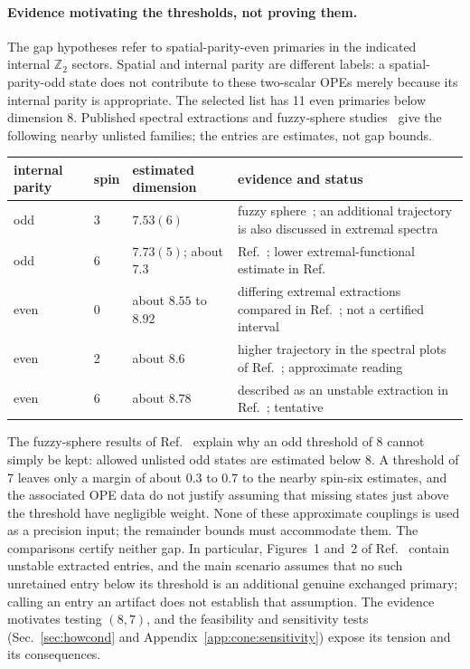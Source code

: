 \documentclass[11pt,a4paper]{article}
\numberwithin{equation}{section}
\begin{document}
\paragraph{Evidence motivating the thresholds, not proving them.} The gap hypotheses refer to spatial-parity-even
primaries in the indicated internal $\mathbb Z_2$ sectors. Spatial and internal parity are different labels: a
spatial-parity-odd state does not contribute to these two-scalar OPEs merely because its internal parity is
appropriate. The selected list has 11 even primaries below dimension 8. Published spectral extractions and fuzzy-sphere
studies~\cite{Simmons-Duffin:2016wlq,Henriksson:2022,Zhu:2022,Fardelli:2026} give the following nearby unlisted
families; the entries are estimates, not gap bounds.
\begin{center}\small
\begin{tabular}{@{}llp{}p{}@{}}
\toprule
internal parity & spin & estimated dimension & evidence and status\\
\midrule
odd & 3 & $7.53(6)$ & fuzzy sphere~\cite{Fardelli:2026}; an additional trajectory is also discussed in extremal spectra\\
odd & 6 & $7.73(5)$; about $7.3$ & Ref.~\cite{Fardelli:2026}; lower extremal-functional estimate in Ref.~\cite{Henriksson:2022}\\
even & 0 & about $8.55$ to $8.92$ & differing extremal extractions compared in Ref.~\cite{Henriksson:2022}; not a certified interval\\
even & 2 & about $8.6$ & higher trajectory in the spectral plots of Ref.~\cite{Henriksson:2022}; approximate reading\\
even & 6 & about $8.78$ & described as an unstable extraction in Ref.~\cite{Henriksson:2022}; tentative\\
\bottomrule
\end{tabular}
\end{center}
The fuzzy-sphere results of Ref.~\cite{Fardelli:2026} explain why an odd threshold of 8 cannot simply be kept: allowed
unlisted odd states are estimated below 8. A threshold of 7 leaves only a margin of about $0.3$ to $0.7$ to the nearby
spin-six estimates, and the associated OPE data do not justify assuming that missing states just above the threshold
have negligible weight. None of these approximate couplings is used as a precision input; the remainder bounds must
accommodate them. The comparisons certify neither gap. In particular, Figures~1 and~2 of
Ref.~\cite{Simmons-Duffin:2016wlq} contain unstable extracted entries, and the main scenario assumes that no such
unretained entry below its threshold is an additional genuine exchanged primary; calling an entry an artifact does not
establish that assumption. The evidence motivates testing $(8,7)$, and the feasibility and sensitivity tests
(Sec.~\ref{sec:howcond} and Appendix~\ref{app:cone:sensitivity}) expose its tension and its consequences.
\end{document}
